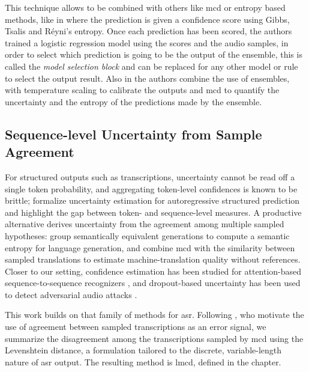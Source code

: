 This technique allows to be combined with others like \acrshort{mcd} or entropy based methods, like in \cite{gitman2023confidence} where the prediction is given a confidence score using Gibbs, Tsalis and Réyni's entropy. Once each prediction has been scored, the authors trained a logistic regression model using the scores and the audio samples, in order to select which prediction is going to be the output of the ensemble, this is called the \textit{model selection block} and can be replaced for any other model or rule to select the output result.
Also in \cite{tu2022unsupervised} the authors combine the use of ensembles, with temperature scaling to calibrate the outputs and \acrshort{mcd} to quantify the uncertainty and the entropy of the predictions made by the ensemble.


\subsection{Sequence-level Uncertainty from Sample Agreement}\label{sec:sample_agreement}

For structured outputs such as transcriptions, uncertainty cannot be read off a single token probability, and aggregating token-level confidences is known to be brittle; \cite{malinin2020uncertainty} formalize uncertainty estimation for autoregressive structured prediction and highlight the gap between token- and sequence-level measures. A productive alternative derives uncertainty from the agreement among multiple sampled hypotheses: \cite{kuhn2023semantic} group semantically equivalent generations to compute a semantic entropy for language generation, and \cite{fomicheva2020unsupervised} combine \acrshort{mcd} with the similarity between sampled translations to estimate machine-translation quality without references. Closer to our setting, confidence estimation has been studied for attention-based sequence-to-sequence recognizers \cite{li2021confidence}, and dropout-based uncertainty has been used to detect adversarial audio attacks \cite{jayashankar2020detecting}.

This work builds on that family of methods for \acrshort{asr}. Following \cite{rodriguez2024uncertainty}, who motivate the use of agreement between sampled transcriptions as an error signal, we summarize the disagreement among the transcriptions sampled by \acrshort{mcd} using the Levenshtein distance, a formulation tailored to the discrete, variable-length nature of \acrshort{asr} output. The resulting method is \acrfull{lmcd}, defined in the  chapter.

